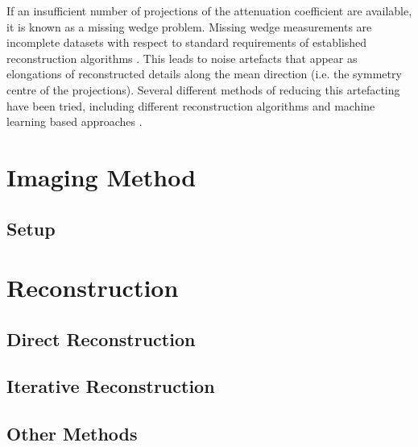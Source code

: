 If an insufficient number of projections of the attenuation coefficient are available, it is known as a missing wedge problem. Missing wedge measurements are incomplete datasets with respect to standard requirements of established reconstruction algorithms \cite{10.1111/jmi.12313}. This leads to noise artefacts that appear as elongations of reconstructed details along the mean direction (i.e. the symmetry centre of the projections). Several different methods of reducing this artefacting have been tried, including different reconstruction algorithms \cite{10.1111/jmi.12313} and machine learning based approaches \cite{liu2020tomogan}. 


\section{Imaging Method}
\subsection{Setup}


\section{Reconstruction}

\subsection{Direct Reconstruction}
\subsection{Iterative Reconstruction}

\subsection{Other Methods}
